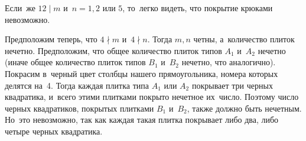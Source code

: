 Если~же $12\mid m$ и~$n=1,2$ или $5$, то~легко видеть, что покрытие крюками
невозможно.
\par Предположим теперь, что $4\nmid m$ и~$4\nmid n$.
Тогда $m,n$ четны, а~количество плиток нечетно.
Предположим, что общее количество плиток типов $A_1$ и~$A_2$ нечетно (иначе
общее количество плиток типов $B_1$ и~$B_2$ нечетно, что аналогично).
Покрасим в~черный цвет столбцы нашего прямоугольника, номера которых делятся на~4.
Тогда каждая плитка типа $A_1$ или $A_2$ покрывает три черных квадратика, и~всего этими плитками покрыто нечетное их~число.
Поэтому число черных квадратиков, покрытых плитками $B_1$ и~$B_2$, также должно
быть нечетным.
Но~это невозможно, так как каждая такая плитка покрывает либо два, либо четыре
черных квадратика.
\fi %

\endgroup %

